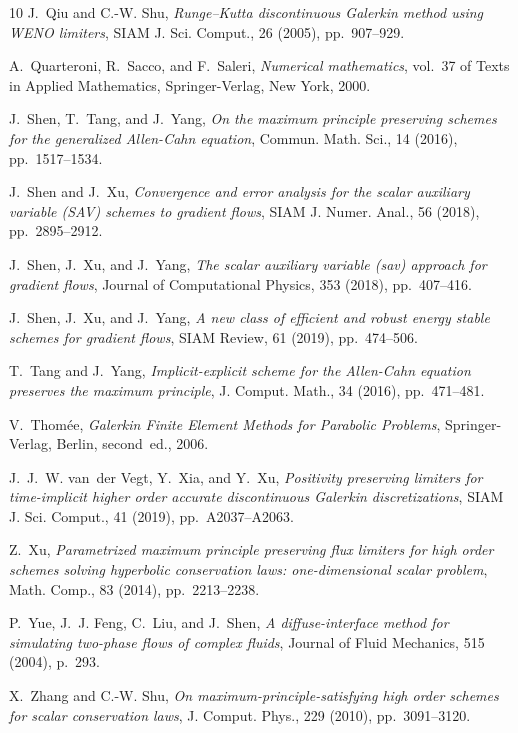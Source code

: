 \documentclass[10pt,final,leqno,onefignum,onetabnum]{siamltex}%
\begin{document}
\begin{thebibliography}{10}
{\sc J.~Qiu and C.-W. Shu}, {\em {Runge--Kutta discontinuous Galerkin method
  using WENO limiters}}, SIAM J. Sci. Comput., 26 (2005), pp.~907--929.

{\sc A.~Quarteroni, R.~Sacco, and F.~Saleri}, {\em Numerical mathematics},
  vol.~37 of Texts in Applied Mathematics, Springer-Verlag, New York, 2000.

{\sc J.~Shen, T.~Tang, and J.~Yang}, {\em On the maximum principle preserving
  schemes for the generalized {A}llen-{C}ahn equation}, Commun. Math. Sci., 14
  (2016), pp.~1517--1534.

{\sc J.~Shen and J.~Xu}, {\em Convergence and error analysis for the scalar
  auxiliary variable ({SAV}) schemes to gradient flows}, SIAM J. Numer. Anal.,
  56 (2018), pp.~2895--2912.

{\sc J.~Shen, J.~Xu, and J.~Yang}, {\em The scalar auxiliary variable (sav)
  approach for gradient flows}, Journal of Computational Physics, 353 (2018),
  pp.~407--416.

{\sc J.~Shen, J.~Xu, and J.~Yang}, {\em A new class of efficient and robust
  energy stable schemes for gradient flows}, SIAM Review, 61 (2019),
  pp.~474--506.

{\sc T.~Tang and J.~Yang}, {\em Implicit-explicit scheme for the {A}llen-{C}ahn
  equation preserves the maximum principle}, J. Comput. Math., 34 (2016),
  pp.~471--481.

{\sc V.~Thom{\'e}e}, {\em Galerkin {F}inite {E}lement {M}ethods for {P}arabolic
  {P}roblems}, Springer-Verlag, Berlin, second~ed., 2006.

{\sc J.~J.~W. van~der Vegt, Y.~Xia, and Y.~Xu}, {\em Positivity preserving
  limiters for time-implicit higher order accurate discontinuous {G}alerkin
  discretizations}, SIAM J. Sci. Comput., 41 (2019), pp.~A2037--A2063.

{\sc Z.~Xu}, {\em Parametrized maximum principle preserving flux limiters for
  high order schemes solving hyperbolic conservation laws: one-dimensional
  scalar problem}, Math. Comp., 83 (2014), pp.~2213--2238.

{\sc P.~Yue, J.~J. Feng, C.~Liu, and J.~Shen}, {\em A diffuse-interface method
  for simulating two-phase flows of complex fluids}, Journal of Fluid
  Mechanics, 515 (2004), p.~293.

{\sc X.~Zhang and C.-W. Shu}, {\em On maximum-principle-satisfying high order
  schemes for scalar conservation laws}, J. Comput. Phys., 229 (2010),
  pp.~3091--3120.

\end{thebibliography}
\end{document}
